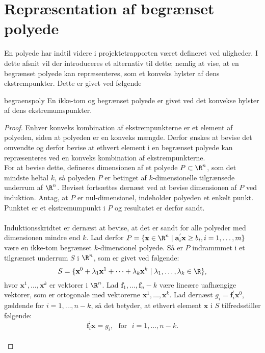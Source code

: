 \section{Repræsentation af begrænset polyede}
%
En polyede har indtil videre i projektetrapporten været defineret ved uligheder. I dette afsnit vil der introduceres et alternativ til dette; nemlig at vise, at en begrænset polyede kan repræsenteres, som et konveks hylster af dens ekstrempunkter. Dette er givet ved følgende \\
\begin{thm}{}{begraenspoly}
En ikke-tom og begrænset polyede er givet ved det konvekse hylster af dens ekstremumspunkter.
\end{thm}
\begin{proof}
Enhver konveks kombination af ekstrempunkterne er et element af polyeden, siden at polyeden er en konveks mængde. Derfor ønskes at bevise det omvendte og derfor bevise at ethvert element i en begrænset polyede kan repræsenteres ved en konveks kombination af ekstrempunkterne. \\
For at bevise dette, defineres dimensionen af et polyede $P \subset \R^n$, som det mindste heltal $k$, så polyeden $P$ er betinget af $k$-dimensionelle tilgrænsede underrum af $\R^n$. Beviset fortsættes dernæst ved at bevise dimensionen af $P$ ved induktion. Antag, at $P$ er nul-dimensionel, indeholder polyeden et enkelt punkt. Punktet er et ekstremumpunkt i $P$ og resultatet er derfor sandt. \\\\
Induktionsskridtet er dernæst at bevise, at det er sandt for alle polyeder med dimensionen mindre end $k$. Lad derfor $P = \{\textbf{x} \in \R^n \mid \mathbf{a}_{i}^{'} \textbf{x} \geq b_i, i=1,\ldots,m\}$ være en ikke-tom begrænset $k$-dimensionel polyede. Så er $P$ indrammmet i et tilgrænset  underrum $S$ i $\R^n$, som er givet ved følgende: \\
$$S = \{\textbf{x}^0+\lambda_1\textbf{x}^1+\cdots+\lambda_k\textbf{x}^k \mid \lambda_1,\ldots,\lambda_k \in \R\},$$
hvor $\textbf{x}^1,\ldots,\textbf{x}^k$ er vektorer i $\R^n$. Lad $\textbf{f}_1,\ldots,\textbf{f}_n-k$ være lineære uafhængige vektorer, som er ortogonale med vektorerne $\textbf{x}^1,\ldots,\textbf{x}^k$. Lad dernæst $g_i=\mathbf{f}_{i}^{'}\textbf{x}^0$, gældende for $i=1,\ldots,n-k$, så det betyder, at ethvert element $\textbf{x}$ i $S$ tilfredsstiller følgende: \\
$$\mathbf{f}_{i}^{'}\textbf{x}=g_i, \text{     } \text{for} \text{     } i=1,\ldots,n-k.$$ \\

\end{proof}
